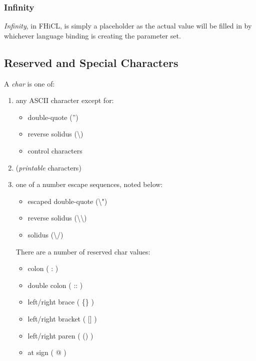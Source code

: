 \documentclass{memarticle}
\begin{document}
{			\subsubsection{Infinity}
				\emph{Infinity}, in FHiCL, is simply a placeholder as the actual value
				will be filled in by whichever language binding is creating the parameter set.	
                \subsection{Reserved and Special Characters}
                        A \emph{char} is one of:
                        \begin{enumerate}
                                \item any ASCII character except for:
                                \begin{itemize}
                                        \item double-quote ('') 
                                        \item reverse solidus (\textbackslash)
                                        \item control characters
                                \end{itemize}
                                \item (\emph{printable} characters)
                                \item one of a number escape sequences, noted below:
                                \begin{itemize}
                                        \item escaped double-quote (\textbackslash")
                                        \item reverse solidus (\textbackslash\textbackslash)
                                        \item solidus (\textbackslash/)
                                \end{itemize}
                                There are a number of reserved char values:
                                \begin{itemize}
                                        \item colon ( : )
                                        \item double colon ( :: )
                                        \item left/right brace ( \{\} )
                                        \item left/right bracket ( [] )
                                        \item left/right paren ( () )
                                        \item at sign ( @ )
                                \end{itemize}           
                        \end{enumerate}
}
\end{document}

